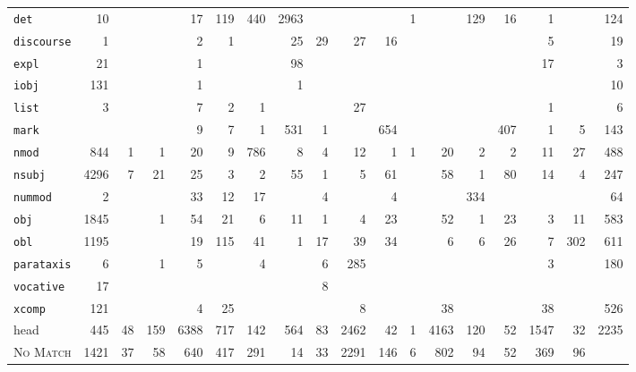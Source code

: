 \documentclass[t,xcolor={svgnames,table}]{beamer}
\begin{document}
\begin{frame}
{\begin{tabular}{lRRRRRRRRRRRRRRRR|R}
\texttt{det} & 10 &  &  & 17 & 119 & 440 & 2963 &  &  &  & 1 &  & 129 & 16 & 1 &  & 124 \\
\texttt{discourse} & 1 &  &  & 2 & 1 &  & 25 & 29 & 27 & 16 &  &  &  &  & 5 &  & 19 \\
\texttt{expl} & 21 &  &  & 1 &  &  & 98 &  &  &  &  &  &  &  & 17 &  & 3 \\
\texttt{iobj} & 131 &  &  & 1 &  &  & 1 &  &  &  &  &  &  &  &  &  & 10 \\
\texttt{list} & 3 &  &  & 7 & 2 & 1 &  &  & 27 &  &  &  &  &  & 1 &  & 6 \\
\texttt{mark} &  &  &  & 9 & 7 & 1 & 531 & 1 &  & 654 &  &  &  & 407 & 1 & 5 & 143 \\
\texttt{nmod} & 844 & 1 & 1 & 20 & 9 & 786 & 8 & 4 & 12 & 1 & 1 & 20 & 2 & 2 & 11 & 27 & 488 \\
\texttt{nsubj} & 4296 & 7 & 21 & 25 & 3 & 2 & 55 & 1 & 5 & 61 &  & 58 & 1 & 80 & 14 & 4 & 247 \\
\texttt{nummod} & 2 &  &  & 33 & 12 & 17 &  & 4 &  & 4 &  &  & 334 &  &  &  & 64 \\
\texttt{obj} & 1845 &  & 1 & 54 & 21 & 6 & 11 & 1 & 4 & 23 &  & 52 & 1 & 23 & 3 & 11 & 583 \\
\texttt{obl} & 1195 &  &  & 19 & 115 & 41 & 1 & 17 & 39 & 34 &  & 6 & 6 & 26 & 7 & 302 & 611 \\
\texttt{parataxis} & 6 &  & 1 & 5 &  & 4 &  & 6 & 285 &  &  &  &  &  & 3 &  & 180 \\
\texttt{vocative} & 17 &  &  &  &  &  &  & 8 &  &  &  &  &  &  &  &  &  \\
\texttt{xcomp} & 121 &  &  & 4 & 25 &  &  &  & 8 &  &  & 38 &  &  & 38 &  & 526 \\
\hline
head & 445 & 48 & 159 & 6388 & 717 & 142 & 564 & 83 & 2462 & 42 & 1 & 4163 & 120 & 52 & 1547 & 32 & 2235 \\
\hline
\textsc{No Match} & 1421 & 37 & 58 & 640 & 417 & 291 & 14 & 33 & 2291 & 146 & 6 & 802 & 94 & 52 & 369 & 96 & 
\end{tabular}
}
\end{frame}
\end{document}
